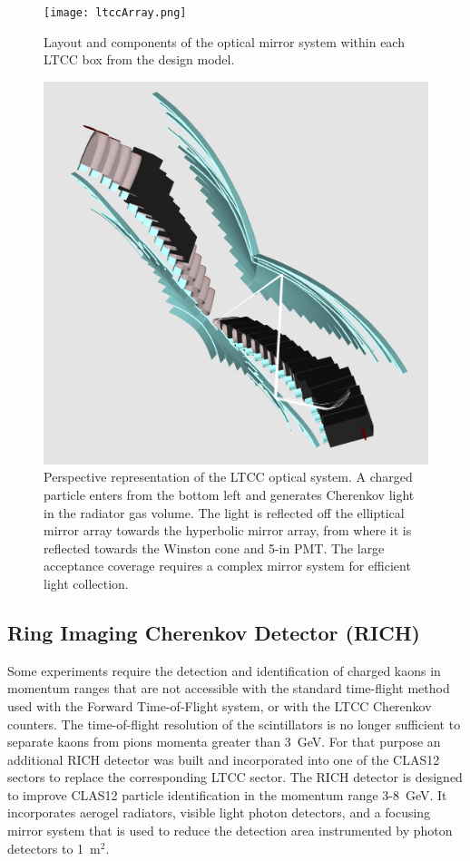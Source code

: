 \documentclass[final,3p,twocolumn]{elsarticle}
\begin{document}
\begin{figure}[htbp!]
\centerline{\texttt{[image: ltccArray.png]}}
\caption{Layout and components of the optical mirror system within each LTCC box from the design model.}
\label{ltcc1}
\end{figure}
\begin{figure}[htbp!]
\centerline{\includegraphics[width=0.95\columnwidth]{ltcc-mod6.png}}
\caption{Perspective representation of the LTCC optical system. A charged particle enters from the bottom left
  and generates Cherenkov light in the radiator gas volume. The light is reflected off the elliptical mirror array
  towards the hyperbolic mirror array, from where it is reflected towards the Winston cone and 5-in PMT. The
  large acceptance coverage requires a complex mirror system for efficient light collection.}
\label{ltcc2}
\end{figure}

\subsection{Ring Imaging Cherenkov Detector (RICH)} 

Some experiments require the detection and identification of charged kaons in momentum ranges that are not 
accessible with the standard time-flight method used with the Forward Time-of-Flight system, or with the LTCC
Cherenkov counters. The time-of-flight resolution of the scintillators is no longer sufficient to separate kaons
from pions momenta greater than 3~GeV. For that purpose an additional RICH detector was built and incorporated
into one of the CLAS12 sectors to replace the corresponding LTCC sector. The RICH detector is designed to improve
CLAS12 particle identification in the momentum range 3-8~GeV. It incorporates aerogel radiators, visible light photon
detectors, and a focusing mirror system that is used to reduce the detection area instrumented by photon detectors
to 1~m$^2$.
\end{document}
